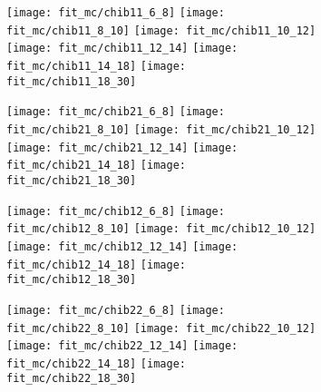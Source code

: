 \begin{figure}[ht]
  \centering
    \begin{subfigure}[b]{\textwidth}
      \centering
      \texttt{[image: fit\_mc/chib11\_6\_8]}
      \texttt{[image: fit\_mc/chib11\_8\_10]}
      \texttt{[image: fit\_mc/chib11\_10\_12]}
      \texttt{[image: fit\_mc/chib11\_12\_14]}
      \texttt{[image: fit\_mc/chib11\_14\_18]}
      \texttt{[image: fit\_mc/chib11\_18\_30]}
      \caption{\chiboneOneP}
      \label{fig:fit_mc_chiboneOneP}
    \end{subfigure}
    \begin{subfigure}[b]{\textwidth}
      \centering
      \texttt{[image: fit\_mc/chib21\_6\_8]}
      \texttt{[image: fit\_mc/chib21\_8\_10]}
      \texttt{[image: fit\_mc/chib21\_10\_12]}
      \texttt{[image: fit\_mc/chib21\_12\_14]}
      \texttt{[image: fit\_mc/chib21\_14\_18]}
      \texttt{[image: fit\_mc/chib21\_18\_30]}
      \caption{\chibtwoOneP}
      \label{fig:fit_mc_chibtwoOneP}
    \end{subfigure}
    \begin{subfigure}[b]{\textwidth}
      \centering
      \texttt{[image: fit\_mc/chib12\_6\_8]}
      \texttt{[image: fit\_mc/chib12\_8\_10]}
      \texttt{[image: fit\_mc/chib12\_10\_12]}
      \texttt{[image: fit\_mc/chib12\_12\_14]}
      \texttt{[image: fit\_mc/chib12\_14\_18]}
      \texttt{[image: fit\_mc/chib12\_18\_30]}
      \caption{\chiboneTwoP}
      \label{fig:fit_mc_chiboneTwoP}
    \end{subfigure}
    \begin{subfigure}[b]{\textwidth}
      \centering
      \texttt{[image: fit\_mc/chib22\_6\_8]}
      \texttt{[image: fit\_mc/chib22\_8\_10]}
      \texttt{[image: fit\_mc/chib22\_10\_12]}
      \texttt{[image: fit\_mc/chib22\_12\_14]}
      \texttt{[image: fit\_mc/chib22\_14\_18]}
      \texttt{[image: fit\_mc/chib22\_18\_30]}
      \caption{\chibtwoTwoP}
      \label{fig:fit_mc_chibtwoTwoP}
    \end{subfigure}    
    \begin{subfigure}[b]{\textwidth}

\end{subfigure}
\end{figure}
